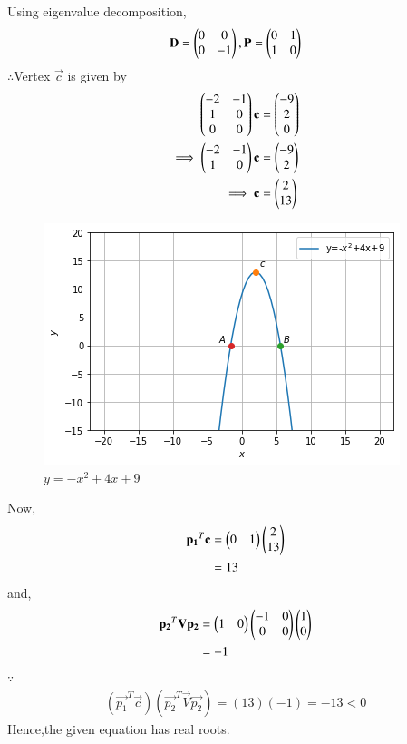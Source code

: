 \begin{enumerate}
    Using eigenvalue decomposition,
    \begin{align}
        \mathbf{D} = \begin{pmatrix}0 & 0\\0 & -1\end{pmatrix} ,\mathbf{P}=\begin{pmatrix}0 & 1\\1 & 0\end{pmatrix}
    \end{align}
    $\therefore$Vertex $\vec{c}$ is given by
    \begin{align}
        \begin{pmatrix}-2 & -1 \\ 1 & 0 \\ 0 & 0\end{pmatrix}\mathbf{c} &= \begin{pmatrix}-9 \\ 2 \\ 0\end{pmatrix} \\
        \implies  \begin{pmatrix}-2 & -1 \\ 1 & 0\end{pmatrix}\mathbf{c} &= \begin{pmatrix}-9 \\ 2\end{pmatrix}
        \\
        \implies \mathbf{c} &= \begin{pmatrix}2\\13\end{pmatrix}
    \end{align}
    
    \begin{figure}[!ht]
    \centering
    \includegraphics[width=\columnwidth]{app/1/Figures/ChallengeProblem3_4.png}
    \caption{$y=-x^2+4x+9$}
    \label{quadform/app/1/ex3}	
    \end{figure}
    
    Now,
    \begin{align}
        \mathbf{p_1}^T\mathbf{c} &= \begin{pmatrix}0 & 1\end{pmatrix}\begin{pmatrix}2 \\ 13\end{pmatrix}
        \\
        &= 13
    \end{align}
    and,
    \begin{align}
        \mathbf{p_2}^T\mathbf{V}\mathbf{p_2} &= \begin{pmatrix}1 & 0\end{pmatrix}\begin{pmatrix}-1 & 0\\0& 0\end{pmatrix}\begin{pmatrix}1 \\ 0\end{pmatrix}
        \\
        &= -1
    \end{align}
    $\because$
    \begin{align}
    (\vec{p_1}^T\vec{c})(\vec{p_2}^T\vec{V}\vec{p_2}) = (13)(-1) = -13<0
    \end{align}
    Hence,the given equation has real roots.
\end{enumerate}

